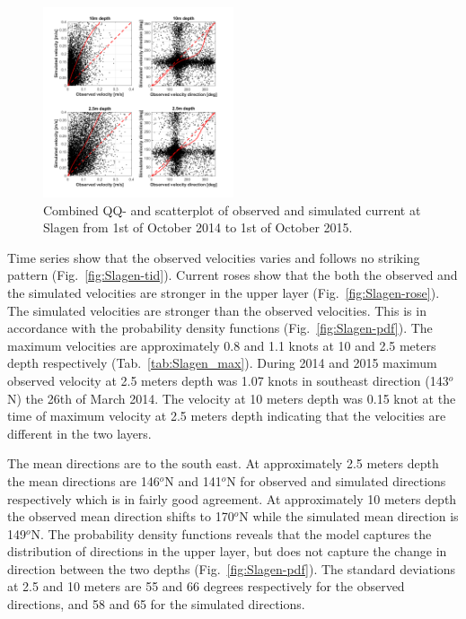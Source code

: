 \documentclass[12pt,a4paper,english]{article}
\begin{document}
\begin{figure}[t]
\centerline{
\includegraphics*[trim=0cm 0cm 0cm 0cm,clip=true,width=0.5\textwidth]{Figurer/Slagen_QQ}}
\caption{\small
Combined QQ- and scatterplot of observed and simulated current at Slagen from 1st of October 2014 to 1st of October 2015.}
\label{fig:Slagen_QQ}
\end{figure}

Time series show that the observed velocities varies and follows no striking pattern (Fig.~\ref{fig:Slagen-tid}).
Current roses show that the both the observed and the simulated velocities are stronger in the upper layer (Fig.~\ref{fig:Slagen-rose}). The simulated velocities are stronger than the observed velocities. This is in accordance with the probability density functions (Fig.~\ref{fig:Slagen-pdf}). The maximum velocities are approximately 0.8 and 1.1 knots at 10 and 2.5 meters depth respectively (Tab.~\ref{tab:Slagen_max}). During 2014 and 2015 maximum observed velocity at 2.5 meters depth was 1.07 knots in southeast direction (143$^o$N) the 26th of March 2014. The velocity at 10 meters depth was 0.15 knot at the time of maximum velocity at 2.5 meters depth indicating that the velocities are different in the two layers.

The mean directions are to the south east. At approximately 2.5 meters depth the mean directions are 146$^o$N and 141$^o$N for observed and simulated directions respectively which is in fairly good agreement. At approximately 10 meters depth the observed mean direction shifts to 170$^o$N while the simulated mean direction is 149$^o$N. The probability density functions reveals that the model captures the distribution of directions in the upper layer, but does not capture the change in direction between the two depths (Fig.~\ref{fig:Slagen-pdf}). The standard deviations  at 2.5 and 10 meters are 55 and 66 degrees respectively for the observed directions, and 58 and 65 for the simulated directions.
\end{document}
